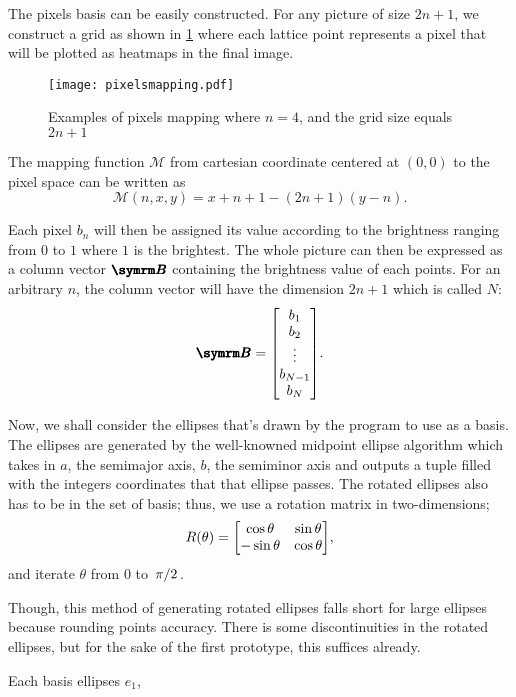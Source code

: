 The pixels basis can be easily constructed. For any picture of size $2n + 1$, we construct a grid as shown in \cref{fig:pixelsgrid} where each lattice point represents a pixel that will be plotted as heatmaps in the final image.
\begin{figure}
    \centering
    \texttt{[image: pixelsmapping.pdf]}
    \caption{Examples of pixels mapping where $n = 4$, and the grid size equals $2n + 1$}
    \label{fig:pixelsgrid}
\end{figure}

The mapping function $\mathcal{M}$ from cartesian coordinate centered at $(0, 0)$ to the pixel space can be written as
\begin{equation}
    \mathcal{M}(n, x, y) = x + n + 1 - (2n + 1)(y - n).
\end{equation}

Each pixel $b_n$ will then be assigned its value according to the brightness ranging from $0$ to $1$ where $1$ is the brightest. The whole picture can then be expressed as a column vector $\vv{B}$ containing the brightness value of each points. For an arbitrary $n$, the column vector will have the dimension $2n + 1$ which is called $N$:
\begin{equation}
    \vv{B} = \mqty[b_1 \\ b_2 \\ \vdots \\ b_{N - 1} \\ b_{N}].
\end{equation}

Now, we shall consider the ellipses that's drawn by the program to use as a basis. The ellipses are generated by the well-knowned midpoint ellipse algorithm which takes in $a$, the semimajor axis, $b$, the semiminor axis and outputs a tuple filled with the integers coordinates that that ellipse passes. The rotated ellipses also has to be in the set of basis; thus, we use a rotation matrix in two-dimensions;
\begin{equation}
    R(\theta) = \mqty[\cos\theta & \sin\theta \\ -\sin\theta & \cos\theta],
\end{equation}
and iterate $\theta$ from $0$ to $\flatfrac{\pi}{2}$.

Though, this method of generating rotated ellipses falls short for large ellipses because rounding points accuracy. There is some discontinuities in the rotated ellipses, but for the sake of the first prototype, this suffices already.

Each basis ellipses $e_1$,